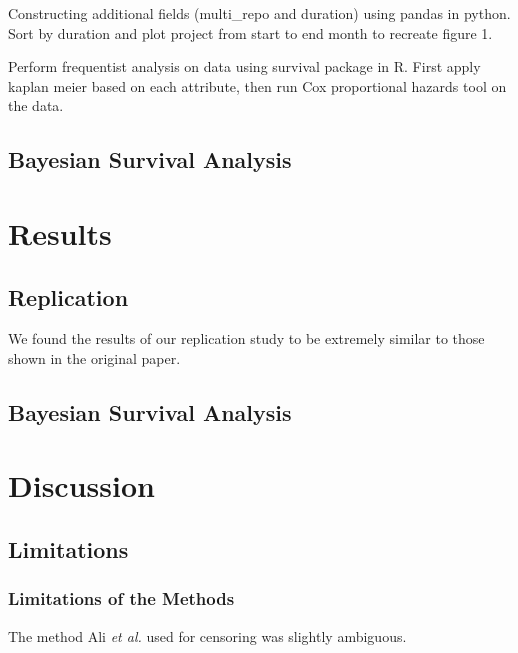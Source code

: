 \documentclass[acmconf]{acmart}
\begin{document}
Constructing additional fields (multi\_repo and duration) using pandas in python. Sort by duration and plot project from start to end month to recreate figure 1.

Perform frequentist analysis on data using survival package in R. First apply kaplan meier based on each attribute, then run Cox proportional hazards tool on the data.

\subsection{Bayesian Survival Analysis}


\section{Results}

\subsection{Replication}

We found the results of our replication study to be extremely similar to those shown in the original paper.



\subsection{Bayesian Survival Analysis}


\section{Discussion}

\subsection{Limitations}

\subsubsection{Limitations of the Methods}

The method Ali \emph{et al.} used for censoring was slightly ambiguous.
\end{document}
